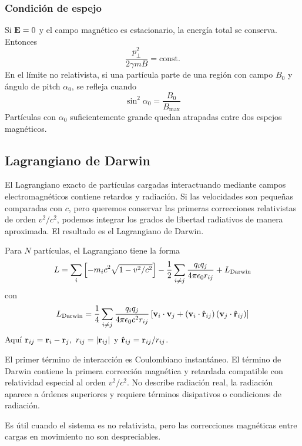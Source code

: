 \documentclass[]{article}
\numberwithin{equation}{section}
\begin{document}
\subsubsection{Condición de espejo}
Si $\mathbf{E} = 0$ y el campo magnético es estacionario, la energía total se conserva. Entonces
\begin{equation}
	\frac{p_\perp^2}{2 \gamma m B} = \mathrm{const.}
\end{equation}
En el límite no relativista, si una partícula parte de una región con campo $B_0$ y ángulo de pitch $\alpha_0$, se refleja cuando
\begin{equation}
	\sin^2\alpha_0 = \frac{B_0}{B_\mathrm{max}}
\end{equation}
Partículas con $\alpha_0$ suficientemente grande quedan atrapadas entre dos espejos magnéticos.

\subsection{Lagrangiano de Darwin}
El Lagrangiano exacto de partículas cargadas interactuando mediante campos electromagnéticos contiene retardos y radiación. Si las velocidades son pequeñas comparadas con $c$, pero queremos conservar las primeras correcciones relativistas de orden $v^2/c^2$, podemos integrar los grados de libertad radiativos de manera aproximada. El resultado es el Lagrangiano de Darwin.

Para $N$ partículas, el Lagrangiano tiene la forma
\begin{equation}
	L = \sum_{i}\left[-m_i c^2 \sqrt{1 - v^2/c^2}\right] - \frac{1}{2}\sum_{i \neq j} \frac{q_i q_j}{4 \pi \epsilon_{0} r_{ij}} + L_\mathrm{Darwin}
\end{equation}
con
\begin{equation}
	L_\mathrm{Darwin} = \frac{1}{4} \sum_{i \neq j} \frac{q_i q_j}{4\pi\epsilon_{0} c^2 r_{ij}} \left[\mathbf{v}_i\cdot\mathbf{v}_j + \left(\mathbf{v}_i\cdot\hat{\mathbf{r}}_{ij}\right) \left(\mathbf{v}_j\cdot\hat{\mathbf{r}}_{ij}\right) \right]
\end{equation}
Aquí $\mathbf{r}_{ij} = \mathbf{r}_i - \mathbf{r}_j, ~ r_{ij} = |\mathbf{r}_{ij}|$ y $\hat{\mathbf{r}}_{ij} = \mathbf{r}_{ij}/r_{ij}$. 

El primer término de interacción es Coulombiano instantáneo. El término de Darwin contiene la primera corrección magnética y retardada compatible con relatividad especial al orden $v^2/c^2$. No describe radiación real, la radiación aparece a órdenes superiores y requiere términos disipativos o condiciones de radiación.

Es útil cuando el sistema es no relativista, pero las correcciones magnéticas entre cargas en movimiento no son despreciables.
\end{document}
